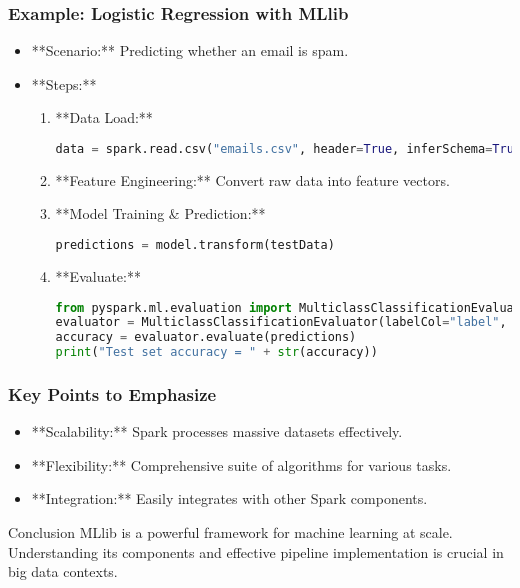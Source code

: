 \documentclass[aspectratio=169]{beamer}
\begin{document}
\begin{frame}[fragile]
    \frametitle{Example: Logistic Regression with MLlib}
    \begin{itemize}
        \item **Scenario:** Predicting whether an email is spam.
        \item **Steps:**
            \begin{enumerate}
                \item **Data Load:**
                    \begin{lstlisting}[language=Python]
data = spark.read.csv("emails.csv", header=True, inferSchema=True)
                    \end{lstlisting}
                \item **Feature Engineering:** Convert raw data into feature vectors.
                \item **Model Training & Prediction:**
                    \begin{lstlisting}[language=Python]
predictions = model.transform(testData)
                    \end{lstlisting}
                \item **Evaluate:**
                    \begin{lstlisting}[language=Python]
from pyspark.ml.evaluation import MulticlassClassificationEvaluator
evaluator = MulticlassClassificationEvaluator(labelCol="label", predictionCol="prediction", metricName="accuracy")
accuracy = evaluator.evaluate(predictions)
print("Test set accuracy = " + str(accuracy))
                    \end{lstlisting}
            \end{enumerate}
    \end{itemize}
\end{frame}

\begin{frame}[fragile]
    \frametitle{Key Points to Emphasize}
    \begin{itemize}
        \item **Scalability:** Spark processes massive datasets effectively.
        \item **Flexibility:** Comprehensive suite of algorithms for various tasks.
        \item **Integration:** Easily integrates with other Spark components.
    \end{itemize}
    \begin{block}{Conclusion}
        MLlib is a powerful framework for machine learning at scale. Understanding its components and effective pipeline implementation is crucial in big data contexts.
    \end{block}
\end{frame}
\end{document}
